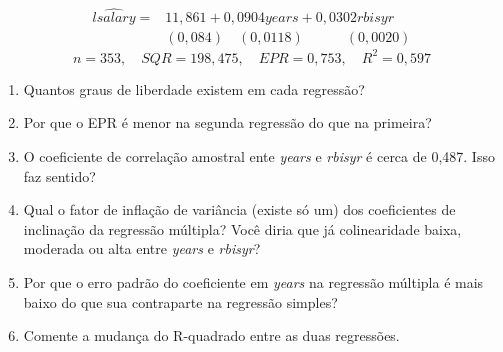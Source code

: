 \documentclass[12pt,letterpaper, onecolumn]{exam}
\begin{document}
\begin{questions}
\begin{equation*}\begin{split}
        \widehat{lsalary} = & 11,861 + 0,0904 years + 0,0302rbisyr\\
        \quad & (0,084) \quad(0,0118) \quad\quad \quad (0,0020) \end{split}
\end{equation*}\begin{equation*}
    n = 353, \quad SQR = 198,475, \quad EPR = 0,753, \quad R^2 = 0,597
\end{equation*}
\begin{enumerate}[label=(\alph*)]
    \item Quantos graus de liberdade existem em cada regressão?
    \item Por que o EPR é menor na segunda regressão do que na primeira?
    \item O coeficiente de correlação amostral ente \textit{years} e \textit{rbisyr} é cerca de 0,487. Isso faz sentido?
    \item Qual o fator de inflação de variância (existe só um) dos coeficientes de inclinação da regressão múltipla? Você diria que já colinearidade baixa, moderada ou alta entre \textit{years} e \textit{rbisyr}?
    \item Por que o erro padrão do coeficiente em \textit{years} na regressão múltipla é mais baixo do que sua contraparte na regressão simples?
    \item Comente a mudança do R-quadrado entre as duas regressões.
\end{enumerate}

\
\



\end{questions}
\end{document}
